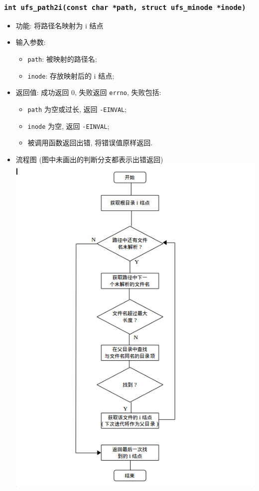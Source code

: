 \documentclass[nofonts, titlepage]{ctexart}
\begin{document}
  \subsubsection[\texttt{ufs\_path2i}]{\texttt{int ufs\_path2i(const char *path, struct ufs\_minode *inode)}}
  \begin{itemize}
\item
  功能: 将路径名映射为 i 结点
\item
  输入参数:

  \begin{itemize}
  \item
    \texttt{path}: 被映射的路径名;
  \item
    \texttt{inode}: 存放映射后的 i 结点;
  \end{itemize}
\item
  返回值: 成功返回 0, 失败返回 \texttt{errno}, 失败包括:

  \begin{itemize}
  \item
    \texttt{path} 为空或过长, 返回 \texttt{-EINVAL};
  \item
    \texttt{inode} 为空, 返回 \texttt{-EINVAL};
  \item
    被调用函数返回出错, 将错误值原样返回.
  \end{itemize}
\item
  流程图 (图中未画出的判断分支都表示出错返回)\\
  \includegraphics[width=14cm]{./images/path2i.png}
  \end{itemize}
\end{document}
